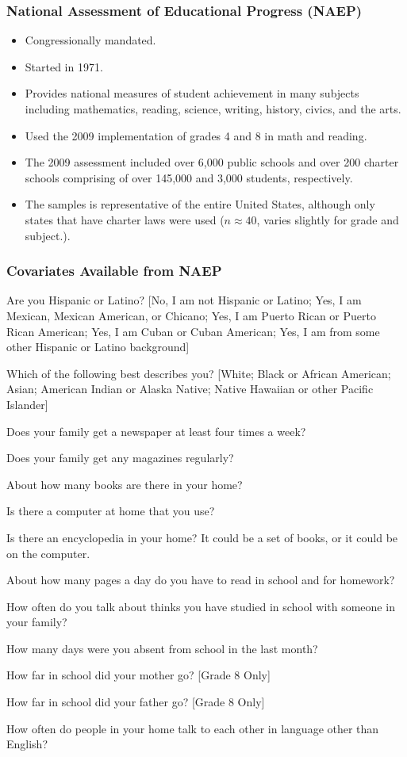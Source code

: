 \documentclass[10pt,handout,mathserif]{beamer}
\begin{document}
\begin{frame}[c]
	\frametitle{National Assessment of Educational Progress (NAEP)}
	\begin{itemize}
    \setlength{\itemsep}{10pt}
	\item Congressionally mandated.
	\item Started in 1971.
	\item Provides national measures of student achievement in many subjects including mathematics, reading, science, writing, history, civics, and the arts.
	    \item Used the 2009 implementation of grades 4 and 8 in math and reading.
	\item The 2009 assessment included over 6,000 public schools and over 200 charter schools comprising of over 145,000 and 3,000 students, respectively. 
	    \item The samples is representative of the entire United States, although only states that have charter laws were used ($n \approx 40$, varies slightly for grade and subject.).
	\end{itemize}

\end{frame}

\begin{frame}
	\frametitle{Covariates Available from NAEP}
	\begin{enumerate}\small{
	\item Are you Hispanic or Latino? [No, I am not Hispanic or Latino; Yes, I am Mexican, Mexican American, or Chicano; Yes, I am Puerto Rican or Puerto Rican American; Yes, I am Cuban or Cuban American; Yes, I am from some other Hispanic or Latino background]
	\item Which of the following best describes you? [White; Black or African American; Asian; American Indian or Alaska Native; Native Hawaiian or other Pacific Islander]
	\item Does your family get a newspaper at least four times a week?
	\item Does your family get any magazines regularly?
	\item About how many books are there in your home?
	\item Is there a computer at home that you use?
	\item Is there an encyclopedia in your home? It could be a set of books, or it could be on the computer.
	\item About how many pages a day do you have to read in school and for homework?
	\item How often do you talk about thinks you have studied in school with someone in your family?
	\item How many days were you absent from school in the last month?
	\item How far in school did your mother go? [Grade 8 Only]
	\item How far in school did your father go? [Grade 8 Only]
	\item How often do people in your home talk to each other in language other than English?
	}
\end{enumerate}
\end{frame}
\end{document}
